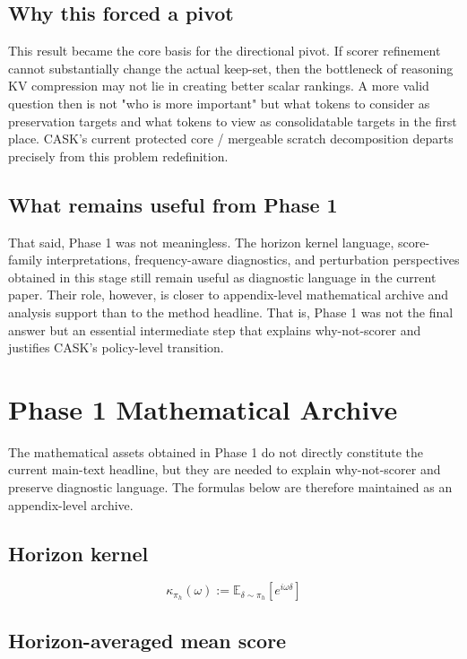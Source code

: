 \subsection{Why this forced a pivot}


This result became the core basis for the directional pivot. If scorer refinement cannot substantially change the actual keep-set, then the bottleneck of reasoning KV compression may not lie in creating better scalar rankings. A more valid question then is not "who is more important" but what tokens to consider as preservation targets and what tokens to view as consolidatable targets in the first place. CASK's current protected core / mergeable scratch decomposition departs precisely from this problem redefinition.


\subsection{What remains useful from Phase 1}


That said, Phase 1 was not meaningless. The horizon kernel language, score-family interpretations, frequency-aware diagnostics, and perturbation perspectives obtained in this stage still remain useful as diagnostic language in the current paper. Their role, however, is closer to appendix-level mathematical archive and analysis support than to the method headline. That is, Phase 1 was not the final answer but an essential intermediate step that explains why-not-scorer and justifies CASK's policy-level transition.


\section{Phase 1 Mathematical Archive}


The mathematical assets obtained in Phase 1 do not directly constitute the current main-text headline, but they are needed to explain why-not-scorer and preserve diagnostic language. The formulas below are therefore maintained as an appendix-level archive.


\subsection{Horizon kernel}


$$
\kappa_{\pi_h}(\omega)
:=
\mathbb{E}_{\delta \sim \pi_h}
\left[e^{i\omega\delta}\right]
$$


\subsection{Horizon-averaged mean score}


